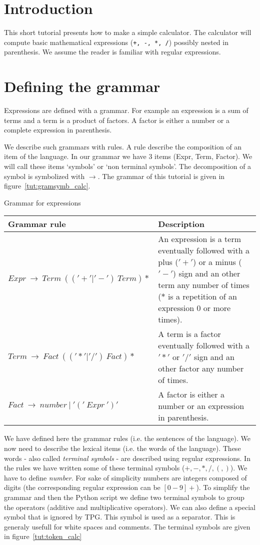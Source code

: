 \section{Introduction}

This short tutorial presents how to make a simple calculator.
The calculator will compute basic mathematical expressions (\verb|+, -, *, /|) possibly nested in parenthesis.
We assume the reader is familiar with regular expressions.

\section{Defining the grammar}

Expressions are defined with a grammar.
For example an expression is a sum of terms and a term is a product of factors. A factor is either a number or a complete expression in parenthesis.

We describe such grammars with rules. A rule describe the composition of an item of the language. In our grammar we have 3 items (Expr, Term, Factor). We will call these items `symbols' or `non terminal symbols'. The decomposition of a symbol is symbolized with $\to$.
The grammar of this tutorial is given in figure~\ref{tut:gramsymb_calc}.

\begin{tableau}
\caption{Grammar for expressions}                           \label{tut:gramsymb_calc}
\begin{tabular}{| l | p{7cm} |}
\hline
    Grammar rule & Description \\
\hline
\hline
    $Expr~\to~Term~(('+'|'-')~Term)*$
        & An expression is a term eventually followed with a plus ($'+'$) or a minus ($'-'$) sign and an other term any number of times ($*$ is a repetition of an expression 0 or more times). \\
\hline
    $Term~\to~Fact~(('*'|'/')~Fact)*$
        & A term is a factor eventually followed with a $'*'$ or $'/'$ sign and an other factor any number of times. \\
\hline
    $Fact~\to~number~|~'('~Expr~')'$
        & A factor is either a number or an expression in parenthesis. \\
\hline
\end{tabular}
\end{tableau}

We have defined here the grammar rules (i.e. the sentences of the language). We now need to describe the lexical items (i.e. the words of the language). These words - also called \emph{terminal symbols} - are described using regular expressions. In the rules we have written some of these terminal symbols ($+, -, *, /, (, )$). We have to define \emph{number}. For sake of simplicity numbers are integers composed of digits (the corresponding regular expression can be $[0-9]+$).
To simplify the grammar and then the Python script we define two terminal symbols to group the operators (additive and multiplicative operators). We can also define a special symbol that is ignored by TPG. This symbol is used as a separator. This is generaly usefull for white spaces and comments. The terminal symbols are given in figure~\ref{tut:token_calc}

